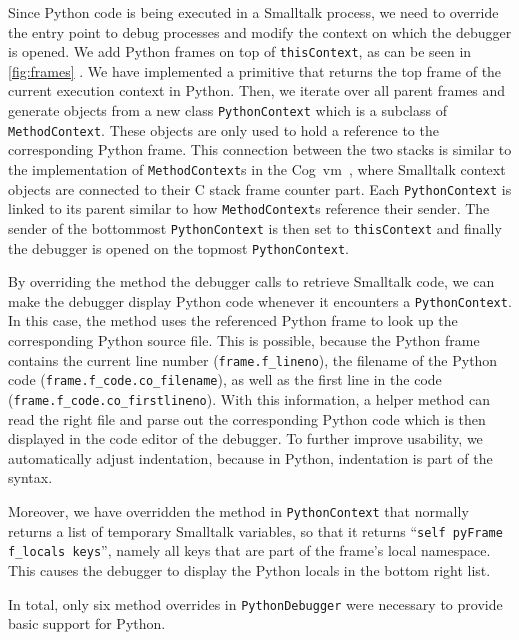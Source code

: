 \documentclass[sigconf,english]{acmart}
\newcommand{\ac}[1]{\gls*{#1}}
\begin{document}
\begin{sloppypar}
Since Python code is being executed in a Smalltalk process, we need to override
the entry point to debug processes and modify the context on which the debugger
is opened. We add Python frames on top of \lstinline{thisContext}, as can be
seen in \autoref{fig:frames} . We have implemented a primitive that returns the
top frame of the current execution context in Python. Then, we iterate over all
parent frames and generate objects from a new class \lstinline{PythonContext}
which is a subclass of \lstinline{MethodContext}. These objects are
only used to hold a reference to the corresponding Python frame. This
connection between the two stacks is similar to the implementation of
\lstinline{MethodContext}s in the
Cog~\ac{vm}~\cite{Miranda2011:The-Cog-Smalltalk-Virtual-Machine:}, where
Smalltalk context objects are connected to their C stack frame counter part.
Each \lstinline{PythonContext} is linked to its parent similar to how
\lstinline{MethodContext}s reference their sender.
The sender of the bottommost
\lstinline{PythonContext} is then set to \lstinline{thisContext} and finally
the debugger is opened on the topmost \lstinline{PythonContext}.
\end{sloppypar}

By overriding the method the debugger calls to retrieve Smalltalk code, we can
make the debugger display Python code whenever it encounters a
\lstinline{PythonContext}.
In this case, the method uses the referenced Python frame to look up the
corresponding Python source file.
This is possible, because the Python frame contains the current line number
(\lstinline{frame.f_lineno}), the filename of the Python code
(\lstinline{frame.f_code.co_filename}), as well as the first line in the code
(\lstinline{frame.f_code.co_firstlineno}).
With this information, a helper method can read the right file and parse out the
corresponding Python code which is then displayed in the code editor of the
debugger.
To further improve usability, we automatically adjust indentation, because
in Python, indentation is part of the syntax.

Moreover, we have overridden the method in \lstinline{PythonContext} that
normally returns a list of temporary Smalltalk variables, so that it returns
``\lstinline{self pyFrame f_locals keys}'', namely all keys that are part of the
frame's local namespace.
This causes the debugger to display the Python locals in the bottom right list.

In total, only six method overrides in \lstinline{PythonDebugger} were
necessary to provide basic support for Python.
\end{document}
